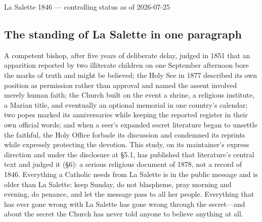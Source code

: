 \begin{statusdossier}{La Salette 1846 --- controlling status as of
2026-07-25}
\end{statusdossier}

\subsection{The standing of La Salette in one paragraph}

A competent bishop, after five years of deliberate delay, judged in
1851 that an apparition reported by two illiterate children on one
September afternoon bore the marks of truth and might be believed;
the Holy See in 1877 described its own position as permission rather
than approval and named the assent involved merely human faith; the
Church built on the event a shrine, a religious institute, a Marian
title, and eventually an optional memorial in one country's calendar;
two popes marked its anniversaries while keeping the reported
register in their own official words; and when a seer's expanded
secret literature began to unsettle the faithful, the Holy Office
forbade its discussion and condemned its reprints while expressly
protecting the devotion. This study, on its maintainer's express
direction and under the disclosure at \S5.1, has published that
literature's central text and judged it (\S6): a serious religious
document of 1878, not a record of 1846. Everything a Catholic needs from La Salette
is in the public message and is older than La Salette: keep Sunday,
do not blaspheme, pray morning and evening, do penance, and let the
message pass to all her people. Everything that has ever gone wrong
with La Salette has gone wrong through the secret---and about the
secret the Church has never told anyone to believe anything at all.

